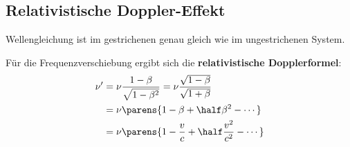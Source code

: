 	\subsection{Relativistische Doppler-Effekt} %
		Wellengleichung ist im gestrichenen genau gleich wie im ungestrichenen System.
		
		Für die Frequenzverschiebung ergibt sich die \textbf{relativistische Dopplerformel}:
		\begin{align*}
			\nu' &= \nu \frac{1-\beta}{\sqrt{1-\beta^2}}
			= \nu \frac{\sqrt{1-\beta}}{\sqrt{1+\beta}} \\
			&= \nu \parens{
				1 - \beta + \half \beta^2 - \cdots
			} \\
			&= \nu \parens{
				1 - \frac v c + \half \frac{v^2}{c^2} - \cdots
			}
		\end{align*}
